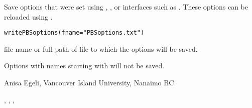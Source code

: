 \documentclass[letterpaper]{book}
\begin{document}
\begin{Description}\relax
Save options that were set using ,
, or interfaces such as .  
These options can be reloaded using .
\end{Description}
\begin{Usage}
\begin{verbatim}
writePBSoptions(fname="PBSoptions.txt")
\end{verbatim}
\end{Usage}
\begin{Arguments}
\begin{ldescription}
\item[\code{fname}] file name or full path of file to which the options will be saved.
\end{ldescription}
\end{Arguments}
\begin{Note}\relax
Options with names starting with  will not be saved.
\end{Note}
\begin{Author}\relax
Anisa Egeli, Vancouver Island University, Nanaimo BC
\end{Author}
\begin{SeeAlso}\relax
{}, ,
, 
\end{SeeAlso}

\printindex{}
\end{document}
